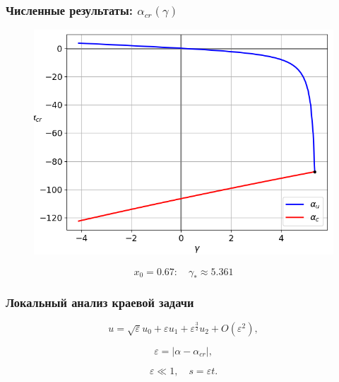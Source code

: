 \documentclass[fullscreen=true, unicode, bookmarks=false]{beamer}
\begin{document}
\begin{frame}
\frametitle{ Численные результаты: $ \alpha_{cr}(\gamma) $ }

\begin{figure} 
\includegraphics[scale=0.55]{alphas_23.png}  
\end{figure}

$$ x_0 = 0.67: \quad \gamma_* \approx 5.361 $$

\end{frame}

\begin{frame}
\frametitle{ Локальный анализ краевой задачи }

\begin{equation}
	u = \sqrt{\varepsilon}u_0 + \varepsilon u_1 + \varepsilon^{\frac{3}{2}} u_2 + O(\varepsilon^2),
\end{equation}

\bigskip

$$ \varepsilon = | \alpha - \alpha_{cr} |, $$

$$ \varepsilon \ll 1, \quad s = \varepsilon t. $$

\end{frame}
\end{document}
